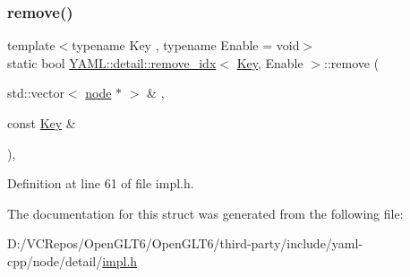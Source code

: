 \subsubsection{\texorpdfstring{remove()}{remove()}}
{\footnotesize\ttfamily template$<$typename Key , typename Enable  = void$>$ \\
static bool \mbox{\hyperlink{struct_y_a_m_l_1_1detail_1_1remove__idx}{Y\+A\+M\+L\+::detail\+::remove\+\_\+idx}}$<$ \mbox{\hyperlink{namespace_y_a_m_l_a67c320aa50d3de7ecba1d0b8775dd684a1af533fc24b0311b8c4d5ac2870283aa}{Key}}, Enable $>$\+::remove (\begin{DoxyParamCaption}\item[{std\+::vector$<$ \mbox{\hyperlink{class_y_a_m_l_1_1detail_1_1node}{node}} $\ast$ $>$ \&}]{,  }\item[{const \mbox{\hyperlink{namespace_y_a_m_l_a67c320aa50d3de7ecba1d0b8775dd684a1af533fc24b0311b8c4d5ac2870283aa}{Key}} \&}]{ }\end{DoxyParamCaption})\hspace{0.3cm}{\ttfamily [inline]}, {\ttfamily [static]}}



Definition at line 61 of file impl.\+h.



The documentation for this struct was generated from the following file\+:\begin{DoxyCompactItemize}
\item 
D\+:/\+V\+C\+Repos/\+Open\+G\+L\+T6/\+Open\+G\+L\+T6/third-\/party/include/yaml-\/cpp/node/detail/\mbox{\hyperlink{detail_2impl_8h}{impl.\+h}}\end{DoxyCompactItemize}
